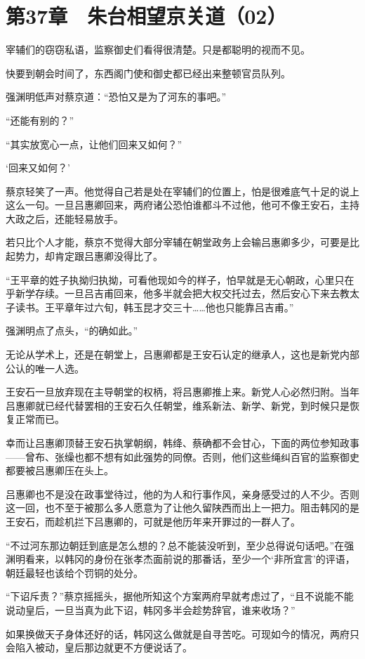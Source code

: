 \section{第37章　朱台相望京关道（02）}

宰辅们的窃窃私语，监察御史们看得很清楚。只是都聪明的视而不见。

快要到朝会时间了，东西阁门使和御史都已经出来整顿官员队列。

强渊明低声对蔡京道：“恐怕又是为了河东的事吧。”

“还能有别的？”

“其实放宽心一点，让他们回来又如何？”

‘回来又如何？’

蔡京轻笑了一声。他觉得自己若是处在宰辅们的位置上，怕是很难底气十足的说上这么一句。一旦吕惠卿回来，两府诸公恐怕谁都斗不过他，他可不像王安石，主持大政之后，还能轻易放手。

若只比个人才能，蔡京不觉得大部分宰辅在朝堂政务上会输吕惠卿多少，可要是比起势力，却肯定跟吕惠卿没得比了。

“王平章的姓子执拗归执拗，可看他现如今的样子，怕早就是无心朝政，心里只在乎新学存续。一旦吕吉甫回来，他多半就会把大权交托过去，然后安心下来去教太子读书。王平章年过六旬，韩玉昆才交三十……他也只能靠吕吉甫。”

强渊明点了点头，“的确如此。”

无论从学术上，还是在朝堂上，吕惠卿都是王安石认定的继承人，这也是新党内部公认的唯一人选。

王安石一旦放弃现在主导朝堂的权柄，将吕惠卿推上来。新党人心必然归附。当年吕惠卿就已经代替罢相的王安石久任朝堂，维系新法、新学、新党，到时候只是恢复正常而已。

幸而让吕惠卿顶替王安石执掌朝纲，韩绛、蔡确都不会甘心，下面的两位参知政事——曾布、张缲也都不想有如此强势的同僚。否则，他们这些绳纠百官的监察御史都要被吕惠卿压在头上。

吕惠卿也不是没在政事堂待过，他的为人和行事作风，亲身感受过的人不少。否则这一回，也不至于被那么多人愿意为了让他久留陕西而出上一把力。阻击韩冈的是王安石，而趁机拦下吕惠卿的，可就是他历年来开罪过的一群人了。

“不过河东那边朝廷到底是怎么想的？总不能装没听到，至少总得说句话吧。”在强渊明看来，以韩冈的身份在张孝杰面前说的那番话，至少一个‘非所宜言’的评语，朝廷最轻也该给个罚铜的处分。

“下诏斥责？”蔡京摇摇头，据他所知这个方案两府早就考虑过了，“且不说能不能说动皇后，一旦当真为此下诏，韩冈多半会趁势辞官，谁来收场？”

如果换做天子身体还好的话，韩冈这么做就是自寻苦吃。可现如今的情况，两府只会陷入被动，皇后那边就更不方便说话了。

